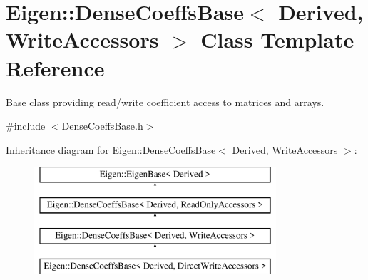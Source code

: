 \hypertarget{class_eigen_1_1_dense_coeffs_base_3_01_derived_00_01_write_accessors_01_4}{}\section{Eigen\+::Dense\+Coeffs\+Base$<$ Derived, Write\+Accessors $>$ Class Template Reference}
\label{class_eigen_1_1_dense_coeffs_base_3_01_derived_00_01_write_accessors_01_4}


Base class providing read/write coefficient access to matrices and arrays.  




{\ttfamily \#include $<$Dense\+Coeffs\+Base.\+h$>$}

Inheritance diagram for Eigen\+::Dense\+Coeffs\+Base$<$ Derived, Write\+Accessors $>$\+:\begin{figure}[H]
\begin{center}
\leavevmode
\includegraphics[height=4.000000cm]{class_eigen_1_1_dense_coeffs_base_3_01_derived_00_01_write_accessors_01_4}
\end{center}
\end{figure}
